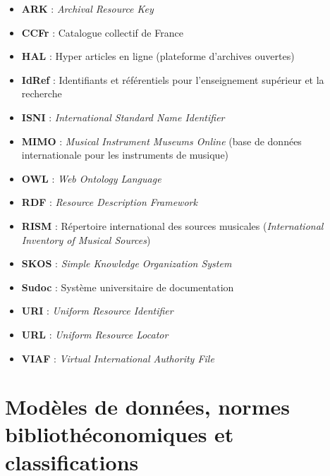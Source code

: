 \begin{itemize}
	\item \textbf{ARK} : \textit{Archival Resource Key}
	\item \textbf{CCFr} : Catalogue collectif de France
	\item \textbf{HAL} : Hyper articles en ligne (plateforme d'archives ouvertes)
	\item \textbf{IdRef} : Identifiants et référentiels pour l'enseignement supérieur et la recherche
	\item \textbf{ISNI} : \textit{International Standard Name Identifier}
	\item \textbf{MIMO} : \textit{Musical Instrument Museums Online} (base de données internationale pour les instruments de musique)
	\item \textbf{OWL} : \textit{Web Ontology Language}
	\item \textbf{RDF} : \textit{Resource Description Framework}
	\item \textbf{RISM} : Répertoire international des sources musicales (\textit{International Inventory of Musical Sources})
	\item \textbf{SKOS} : \textit{Simple Knowledge Organization System}
	\item \textbf{Sudoc} : Système universitaire de documentation
	\item \textbf{URI} : \textit{Uniform Resource Identifier}
	\item \textbf{URL} : \textit{Uniform Resource Locator}
	\item \textbf{VIAF} : \textit{Virtual International Authority File}
\end{itemize}

\section*{Modèles de données, normes bibliothéconomiques et classifications}


